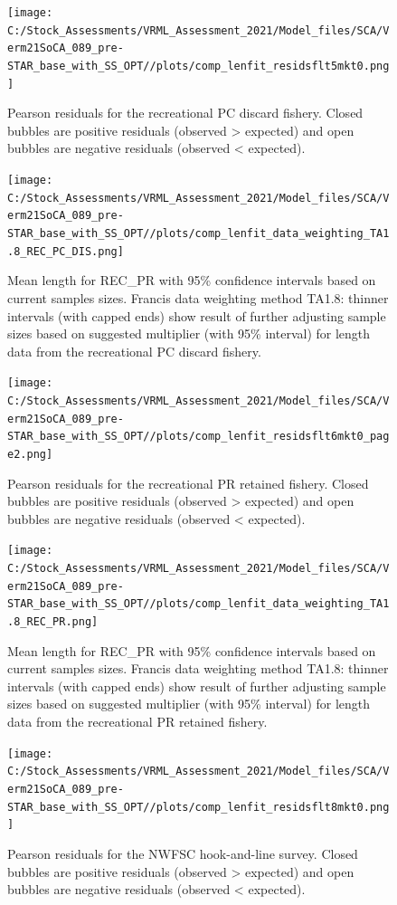 \documentclass[11pt,
  english,
  a4paper,
]{article}
\begin{document}
\begin{figure}
\centering
\texttt{[image: C:/Stock\_Assessments/VRML\_Assessment\_2021/Model\_files/SCA/Verm21SoCA\_089\_pre-STAR\_base\_with\_SS\_OPT//plots/comp\_lenfit\_residsflt5mkt0.png]}
\caption{Pearson residuals for the recreational PC discard fishery. Closed bubbles are positive residuals (observed \textgreater{} expected) and open bubbles are negative residuals (observed \textless{} expected).\label{fig:len-pearson-REC-PC-DIS}}
\end{figure}

\begin{figure}
\centering
\texttt{[image: C:/Stock\_Assessments/VRML\_Assessment\_2021/Model\_files/SCA/Verm21SoCA\_089\_pre-STAR\_base\_with\_SS\_OPT//plots/comp\_lenfit\_data\_weighting\_TA1.8\_REC\_PC\_DIS.png]}
\caption{Mean length for REC\_PR with 95\% confidence intervals based on current samples sizes. Francis data weighting method TA1.8: thinner intervals (with capped ends) show result of further adjusting sample sizes based on suggested multiplier (with 95\% interval) for length data from the recreational PC discard fishery.\label{fig:mean-len-fit-REC-PC-DIS}}
\end{figure}

\begin{figure}
\centering
\texttt{[image: C:/Stock\_Assessments/VRML\_Assessment\_2021/Model\_files/SCA/Verm21SoCA\_089\_pre-STAR\_base\_with\_SS\_OPT//plots/comp\_lenfit\_residsflt6mkt0\_page2.png]}
\caption{Pearson residuals for the recreational PR retained fishery. Closed bubbles are positive residuals (observed \textgreater{} expected) and open bubbles are negative residuals (observed \textless{} expected).\label{fig:len-pearson-REC-PR}}
\end{figure}

\begin{figure}
\centering
\texttt{[image: C:/Stock\_Assessments/VRML\_Assessment\_2021/Model\_files/SCA/Verm21SoCA\_089\_pre-STAR\_base\_with\_SS\_OPT//plots/comp\_lenfit\_data\_weighting\_TA1.8\_REC\_PR.png]}
\caption{Mean length for REC\_PR with 95\% confidence intervals based on current samples sizes. Francis data weighting method TA1.8: thinner intervals (with capped ends) show result of further adjusting sample sizes based on suggested multiplier (with 95\% interval) for length data from the recreational PR retained fishery.\label{fig:mean-len-fit-REC-PR}}
\end{figure}

\begin{figure}
\centering
\texttt{[image: C:/Stock\_Assessments/VRML\_Assessment\_2021/Model\_files/SCA/Verm21SoCA\_089\_pre-STAR\_base\_with\_SS\_OPT//plots/comp\_lenfit\_residsflt8mkt0.png]}
\caption{Pearson residuals for the NWFSC hook-and-line survey. Closed bubbles are positive residuals (observed \textgreater{} expected) and open bubbles are negative residuals (observed \textless{} expected).\label{fig:len-pearson-NWFSC-HKL}}
\end{figure}
\end{document}
